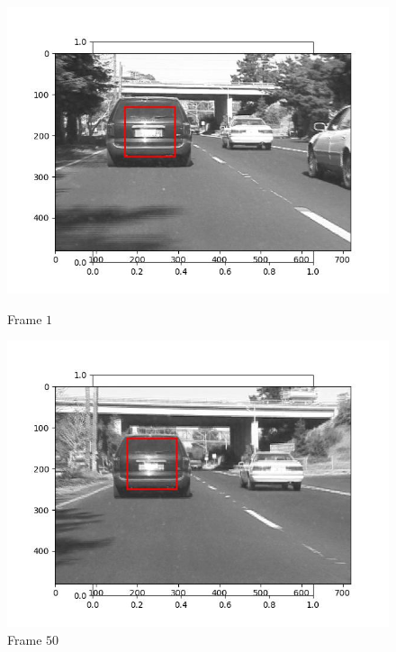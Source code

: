 \begin{figure}[H]
  \centering
  \begin{minipage}{.49\textwidth}
    \centering
    \includegraphics[width=\textwidth]{./figures/lk_affine/car1/frame000001.jpg}
    \caption{Frame $1$}
  \end{minipage}
  \hfill
  \begin{minipage}{.49\textwidth}
    \centering
    \includegraphics[width=\textwidth]{./figures/lk_affine/car1/frame000050.jpg}
    \caption{Frame $50$}
  \end{minipage}
  \hfill
  \begin{minipage}{.49\textwidth}
    \centering

\end{minipage}
\end{figure}
